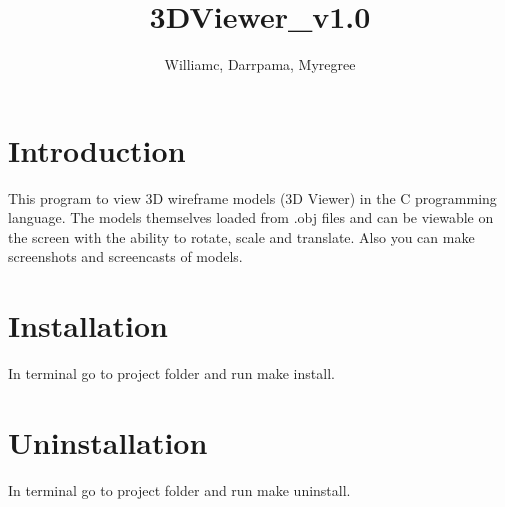 \documentclass{article}
\title{3DViewer_v1.0}
\author{Williamc, Darrpama, Myregree}
\begin{document}
\maketitle

\section{Introduction}

This program to view 3D wireframe models (3D Viewer) in the C programming language. The models themselves loaded from .obj files and can be viewable on the screen with the ability to rotate, scale and translate. Also you can make screenshots and screencasts of models.

\section{Installation}

In terminal go to project folder and run make install.

\section{Uninstallation}

In terminal go to project folder and run make uninstall.
\end{document}
